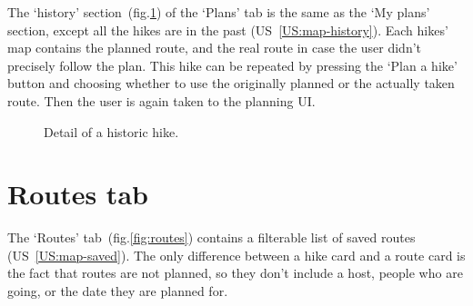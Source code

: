 The `history' section~(fig.\ref{fig:plan-history}) of the `Plans' tab is the same as the `My plans' section, except all the hikes are in the past (US~\ref{US:map-history}).
Each hikes' map contains the planned route, and the real route in case the user didn't precisely follow the plan.
This hike can be repeated by pressing the `Plan a hike' button and choosing whether to use the originally planned or the actually taken route.
Then the user is again taken to the planning UI.

\begin{figure}[h!]
    \centering
    \hfill
    \caption{Detail of a historic hike.}
    \label{fig:plan-history}
\end{figure}

\section{Routes tab}
The `Routes' tab~(fig.\ref{fig:routes}) contains a filterable list of saved routes (US~\ref{US:map-saved}).
The only difference between a hike card and a route card is the fact that routes are not planned, so they don't include a host, people who are going, or the date they are planned for.

